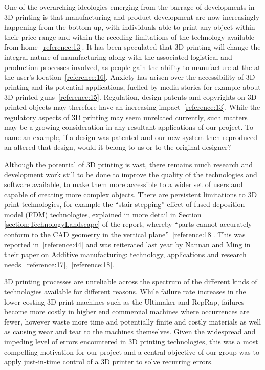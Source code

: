 \documentclass[11pt]{report} %
\begin{document}
One of the overarching ideologies emerging from the barrage of developments in 3D printing is that manufacturing and product development are now increasingly happening from the bottom up, with individuals able to print any object within their price range and within the receding limitations of the technology available from home~\ref{reference:13}. It has been speculated that 3D printing will change the integral nature of manufacturing along with the associated logistical and production processes involved, as people gain the ability to manufacture at the at the user's location~\ref{reference:16}. Anxiety has arisen over the accessibility of 3D printing and its potential applications, fuelled by media stories for example about 3D printed guns~\ref{reference:15}. Regulation, design patents and copyrights on 3D printed objects may therefore have an increasing impact~\ref{reference:13}. While the regulatory aspects of 3D printing may seem unrelated currently, such matters may be a growing consideration in any resultant applications of our project. To name an example, if a design was patented and our new system then reproduced an altered that design, would it belong to us or to the original designer?

Although the potential of 3D printing is vast, there remains much research and development work still to be done to improve the quality of the technologies and software available, to make them more accessible to a wider set of users and capable of creating more complex objects. There are persistent limitations to 3D print technologies, for example the ``stair-stepping'' effect of fused deposition model (FDM) technologies, explained in more detail in Section \ref{section:TechnologyLandscape} of the report, whereby ``parts cannot accurately conform to the CAD geometry in the vertical plane''~\ref{reference:18}. This was reported in~\ref{reference:44} and was reiterated last year by Nannan and Ming in their paper on Additive manufacturing: technology, applications and research needs~\ref{reference:17},~\ref{reference:18}.

3D printing processes are unreliable across the spectrum of the different kinds of technologies available for different reasons. While failure rate increases in the lower costing 3D print machines such as the Ultimaker and RepRap, failures become more costly in higher end commercial machines where occurrences are fewer, however waste more time and potentially finite and costly materials as well as causing wear and tear to the machines themselves. Given the widespread and impeding level of errors encountered in 3D printing technologies, this was a most compelling motivation for our project and a central objective of our group was to apply just-in-time control of a 3D printer to solve recurring errors. 
\end{document}
